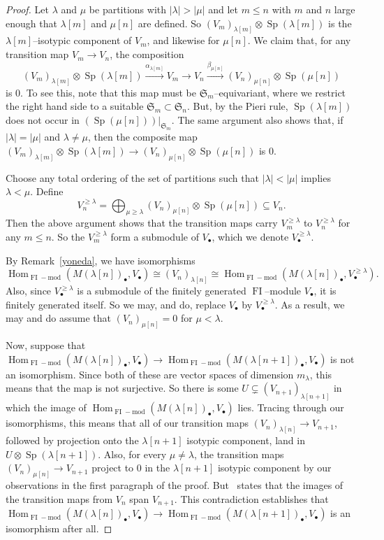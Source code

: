 \documentclass[ALCO,ThmDefs,Unicode,epreuves]{cedram}
\DeclareMathOperator{\FI}{FI}
\DeclareMathOperator{\Hom}{Hom}
\DeclareMathOperator{\Sp}{Sp}
\newcommand{\Sn}{\mathfrak{S}}
\newcommand{\dt}{\bullet}
\begin{document}
\begin{proof} Let $\lambda$ and $\mu$ be partitions with $|\lambda| > |\mu|$ and let $m \leq n$ with $m$ and $n$ large enough that $\lambda[m]$ and $\mu[n]$ are defined. 
So $(V_m)_{\lambda[m]} \otimes \Sp(\lambda[m])$ is the $\lambda[m]$--isotypic component of $V_m$, and likewise for $\mu[n]$. 
We claim that, for any transition map $V_m \to V_n$, the composition 
\[ (V_m)_{\lambda[m]} \otimes \Sp(\lambda[m]) \stackrel{\alpha_{\lambda[m]}}{\longrightarrow} V_m \to V_n \stackrel{\beta_{\mu[n]}}{\longrightarrow} (V_n)_{\mu[n]} \otimes \Sp(\mu[n]) \]
is $0$. To see this, note that this map must be $\Sn_m$--equivariant, where we restrict the right hand side to a suitable $\Sn_m \subset \Sn_n$. 
But, by the Pieri rule, $\Sp(\lambda[m])$ does not occur in $\left. \left( \Sp(\mu[n]) \right)\right|_{\Sn_m}$.
The same argument also shows that, if $|\lambda| = |\mu|$ and $\lambda \neq \mu$, then the composite map $ (V_m)_{\lambda[m]} \otimes \Sp(\lambda[m]) \longrightarrow (V_n)_{\mu[n]} \otimes \Sp(\mu[n])$ is $0$. 

Choose any total ordering of the set of partitions such that $|\lambda| < |\mu|$ implies $\lambda < \mu$. Define
\[ V_n^{\geq \lambda} = \bigoplus_{\mu \geq \lambda} (V_n)_{\mu[n]} \otimes \Sp(\mu[n]) \subseteq V_n . \]
Then the above argument shows that the transition maps carry $V_m^{\geq \lambda}$ to $V_n^{\geq \lambda}$ for any $m \leq n$. 
So the $V_m^{\geq \lambda}$ form a submodule of $V_{\dt}$, which we denote $V_{\dt}^{\geq \lambda}$. 

By Remark~\ref{yoneda}, we have isomorphisms $$\Hom_{\FI-\text{mod}}(M(\lambda[n])_\dt, V_\dt) \cong (V_n)_{\lambda[n]} \cong \Hom_{\FI-\text{mod}}(M(\lambda[n])_\dt, V^{\geq \lambda}_\dt).$$ Also, since $V_{\dt}^{\geq \lambda}$ is a submodule of the finitely generated $\FI$--module $V_{\dt}$, it is finitely generated itself. So we may, and do, replace $V_\dt$ by $V^{\geq \lambda}_\dt$. As a result, we may and do assume that $(V_n)_{\mu[n]}=0$ for $\mu < \lambda$.

Now, suppose that $\Hom_{\FI-\text{mod}}(M(\lambda[n])_\dt, V_\dt) \to \Hom_{\FI-\text{mod}}(M(\lambda[n+1])_\dt, V_\dt)$ is not an isomorphism. Since both of these are vector spaces of dimension $m_{\lambda}$, this means that the map is not surjective. So there is some $U \subsetneq (V_{n+1})_{\lambda[n+1]}$ in which the image of $\Hom_{\FI-\text{mod}}(M(\lambda[n])_\dt, V_\dt)$ lies. Tracing through our isomorphisms, this means that all of our transition maps $(V_n)_{\lambda[n]} \to V_{n+1}$, followed by projection onto the $\lambda[n+1]$ isotypic component, land in $U \otimes \Sp(\lambda[n+1])$. Also, for every $\mu \neq \lambda$, the transition maps $(V_n)_{\mu[n]} \to V_{n+1}$ project to $0$ in the $\lambda[n+1]$ isotypic component by our observations in the first paragraph of the proof. But~\cite[Proposition~3.3.3]{CEF} states that the images of the transition maps from $V_n$ span $V_{n+1}$. This contradiction establishes that $\Hom_{\FI-\text{mod}}(M(\lambda[n])_\dt, V_\dt) \to \Hom_{\FI-\text{mod}}(M(\lambda[n+1])_\dt, V_\dt)$ is an isomorphism after all.
\end{proof}
\end{document}
